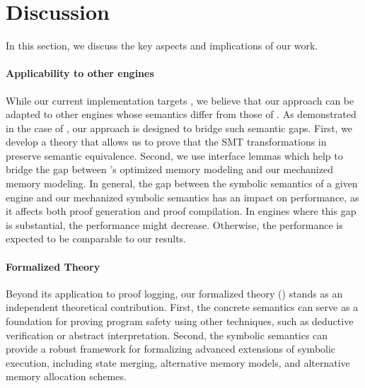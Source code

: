 \section{Discussion}
\label{sec:discussion}

In this section,
we discuss the key aspects and implications of our work.

\paragraph{Applicability to other \SE engines}
While our current implementation targets \klee, %
we believe that our approach can be adapted to other \SE engines whose semantics differ from those of \klee.
As demonstrated in the case of \klee, our approach is designed to bridge such semantic gaps.
First, we develop a theory that allows us to prove that the SMT transformations in \klee preserve semantic equivalence.
Second, we use interface lemmas which help to bridge the gap between \klee's optimized memory modeling and our mechanized memory modeling.
In general, the gap between the symbolic semantics of a given \SE engine and our mechanized symbolic semantics has an impact on performance,
as it affects both proof generation and proof compilation.
In \SE engines where this gap is substantial, the performance might decrease.
Otherwise, the performance is expected to be comparable to our results.

\paragraph{Formalized Theory}

Beyond its application to proof logging, our formalized theory () stands as an independent theoretical contribution.
First, the concrete semantics can serve as a foundation for proving program safety using other techniques,
such as deductive verification or abstract interpretation.
Second, the symbolic semantics can provide a robust framework for formalizing advanced extensions of symbolic execution,
including state merging, alternative memory models, and alternative memory allocation schemes.

